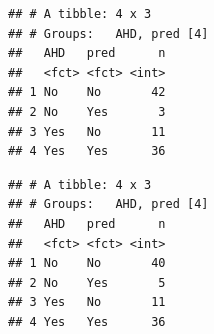 \documentclass[]{article}
\newenvironment{Shaded}{\begin{snugshade}}{\end{snugshade}}
\newcommand{\DataTypeTok}[1]{\textcolor[rgb]{0.13,0.29,0.53}{#1}}
\newcommand{\KeywordTok}[1]{\textcolor[rgb]{0.13,0.29,0.53}{\textbf{#1}}}
\newcommand{\NormalTok}[1]{#1}
\newcommand{\OperatorTok}[1]{\textcolor[rgb]{0.81,0.36,0.00}{\textbf{#1}}}
\newcommand{\StringTok}[1]{\textcolor[rgb]{0.31,0.60,0.02}{#1}}
\begin{document}
\begin{verbatim}
## # A tibble: 4 x 3
## # Groups:   AHD, pred [4]
##   AHD   pred      n
##   <fct> <fct> <int>
## 1 No    No       42
## 2 No    Yes       3
## 3 Yes   No       11
## 4 Yes   Yes      36
\end{verbatim}

\begin{Shaded}
\end{Shaded}

\begin{verbatim}
## # A tibble: 4 x 3
## # Groups:   AHD, pred [4]
##   AHD   pred      n
##   <fct> <fct> <int>
## 1 No    No       40
## 2 No    Yes       5
## 3 Yes   No       11
## 4 Yes   Yes      36
\end{verbatim}
\end{document}
